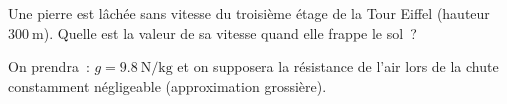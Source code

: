 Une pierre est lâchée sans vitesse du troisième étage de la Tour Eiffel (hauteur
$\qty{300}{\m}$). Quelle est la valeur de sa vitesse quand elle frappe le sol~?

On prendra~: $g=\qty{9.8}{\N\per\kg}$ et on supposera la résistance de l'air
lors de la chute constamment négligeable (approximation grossière).
